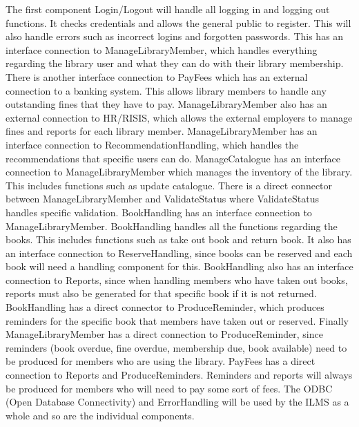 The first component Login/Logout will handle all logging in and logging out functions. It checks credentials and allows the general public to register. This will also handle errors such as incorrect logins and forgotten passwords. This has an interface connection to ManageLibraryMember, which handles everything regarding the library user and what they can do with their library membership. There is another interface connection to PayFees which has an external connection to a banking system. This allows library members to handle any outstanding fines that they have to pay. ManageLibraryMember also has an external connection to HR/RISIS, which allows the external employers to manage fines and reports for each library member. ManageLibraryMember has an interface connection to RecommendationHandling, which handles the recommendations that specific users can do. ManageCatalogue has an interface connection to ManageLibraryMember which manages the inventory of the library. This includes functions such as update catalogue. There is a direct connector between ManageLibraryMember and ValidateStatus where ValidateStatus handles specific validation. BookHandling has an interface connection to ManageLibraryMember. BookHandling handles all the functions regarding the books. This includes functions such as take out book and return book. It also has an interface connection to ReserveHandling, since books can be reserved and each book will need a handling component for this. BookHandling also has an interface connection to Reports, since when handling members who have taken out books, reports must also be generated for that specific book if it is not returned. BookHandling has a direct connector to ProduceReminder, which produces reminders for the specific book that members have taken out or reserved. Finally ManageLibraryMember has a direct connection to ProduceReminder, since reminders (book overdue, fine overdue, membership due, book available) need to be produced for members who are using the library. PayFees has a direct connection to Reports and ProduceReminders. Reminders and reports will always be produced for members who will need to pay some sort of fees. The ODBC (Open Database Connectivity) and ErrorHandling will be used by the ILMS as a whole and so are the individual components.
